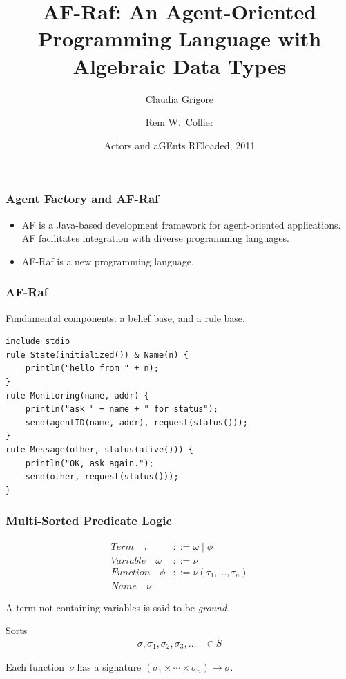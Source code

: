 \documentclass{beamer}
\title{AF-Raf: An Agent-Oriented Programming Language with Algebraic Data Types}
\author{Claudia Grigore \and Rem W.~Collier}
\institute{
  School of Computer Science\\
  University College Dublin\\
  IRCSET}
\date[AGERE~2011]{Actors and aGEnts REloaded, 2011}
\begin{document}
\begin{frame}
  \titlepage
\end{frame}

\begin{frame}
\frametitle{Agent Factory and AF-Raf}
\begin{itemize}
\item
  AF is a Java-based development framework for agent-oriented applications.
  AF facilitates integration with diverse programming languages.
\item
  AF-Raf is a new programming language.
\end{itemize}
\end{frame}

\begin{frame}[fragile]
\frametitle{AF-Raf}
Fundamental components: a belief base, and a rule base.
\medskip
\begin{Verbatim}
include stdio
rule State(initialized()) & Name(n) {
    println("hello from " + n);
}
rule Monitoring(name, addr) {
    println("ask " + name + " for status");
    send(agentID(name, addr), request(status()));
}
rule Message(other, status(alive())) {
    println("OK, ask again.");
    send(other, request(status()));
}
\end{Verbatim}

\end{frame}

\begin{frame}[fragile]
\frametitle{Multi-Sorted Predicate Logic}
\begin{align*}
\mathit{Term}\quad\tau &::= \omega \mid \phi \\
\mathit{Variable}\quad\omega &::= \nu \\
\mathit{Function}\quad\phi &::= \nu(\tau_1,\ldots,\tau_n) \\
\mathit{Name}\quad\nu
\end{align*}

A term not containing variables is said to be
\emph{ground}.

\begin{block}{Sorts}
\begin{align*}
\sigma, \sigma_1, \sigma_2, \sigma_3, \ldots &\in S
\end{align*}

Each function~$\nu$ has a signature
$(\sigma_1\times\cdots\times\sigma_n)\to\sigma$.  
\end{block}

\end{frame}
\end{document}
